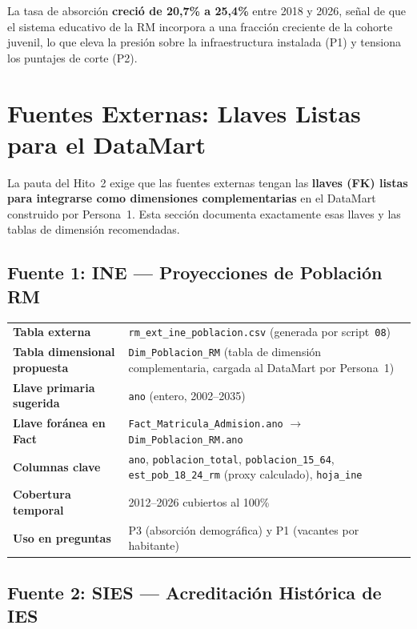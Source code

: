 \documentclass[11pt,a4paper]{article}
\begin{document}
La tasa de absorción \textbf{creció de 20,7\% a 25,4\%} entre 2018 y 2026,
señal de que el sistema educativo de la RM incorpora a una fracción creciente
de la cohorte juvenil, lo que eleva la presión sobre la infraestructura
instalada (P1) y tensiona los puntajes de corte (P2).

\section{Fuentes Externas: Llaves Listas para el DataMart}
\label{sec:llaves}

La pauta del Hito~2 exige que las fuentes externas tengan las \textbf{llaves
(FK) listas para integrarse como dimensiones complementarias} en el DataMart
construido por Persona~1. Esta sección documenta exactamente esas llaves y
las tablas de dimensión recomendadas.

\subsection{Fuente 1: INE — Proyecciones de Población RM}

\begin{center}
\small
\begin{tabularx}{\textwidth}{@{}>{\bfseries}p{3.8cm}Y@{}}
\toprule
Tabla externa & \texttt{rm\_ext\_ine\_poblacion.csv}
  (generada por script~\texttt{08}) \\
Tabla dimensional propuesta &
  \texttt{Dim\_Poblacion\_RM} (tabla de dimensión complementaria,
  cargada al DataMart por Persona~1) \\
Llave primaria sugerida & \texttt{ano} (entero, 2002--2035) \\
Llave foránea en Fact &
  \texttt{Fact\_Matricula\_Admision.ano} $\rightarrow$
  \texttt{Dim\_Poblacion\_RM.ano} \\
Columnas clave &
  \texttt{ano}, \texttt{poblacion\_total}, \texttt{poblacion\_15\_64},
  \texttt{est\_pob\_18\_24\_rm} (proxy calculado), \texttt{hoja\_ine} \\
Cobertura temporal & 2012--2026 cubiertos al 100\% \\
Uso en preguntas & P3 (absorción demográfica) y P1 (vacantes por habitante) \\
\bottomrule
\end{tabularx}
\end{center}

\subsection{Fuente 2: SIES — Acreditación Histórica de IES}
\end{document}
